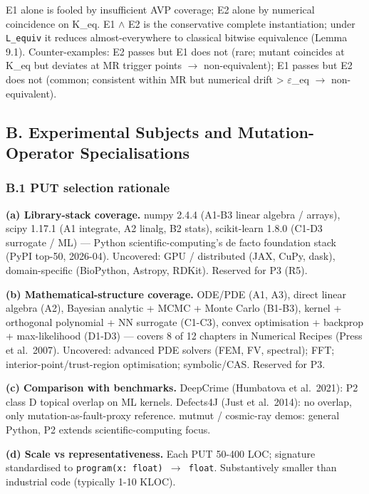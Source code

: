 \documentclass[review,12pt,authoryear]{elsarticle}
\begin{document}
E1 alone is fooled by insufficient AVP coverage; E2 alone by numerical
coincidence on K\_eq. E1 $\wedge$ E2 is the conservative complete
instantiation; under \texttt{L\_equiv} it reduces almost-everywhere to
classical bitwise equivalence (Lemma 9.1). Counter-examples: E2 passes
but E1 does not (rare; mutant coincides at K\_eq but deviates at MR
trigger points $\to$ non-equivalent); E1 passes but E2 does not (common;
consistent within MR but numerical drift \textgreater{} $\varepsilon$\_eq $\to$
non-equivalent).


\subsection{B. Experimental Subjects and Mutation-Operator Specialisations}\label{b.-experimental-subjects-and-mutation-operator-specialisations}

\subsubsection{B.1 PUT selection rationale}\label{b.1-put-selection-rationale-detailed-coverage-argument}

\textbf{(a) Library-stack coverage.} numpy 2.4.4 (A1-B3 linear algebra /
arrays), scipy 1.17.1 (A1 integrate, A2 linalg, B2 stats), scikit-learn
1.8.0 (C1-D3 surrogate / ML) --- Python scientific-computing's de facto
foundation stack (PyPI top-50, 2026-04). Uncovered: GPU / distributed
(JAX, CuPy, dask), domain-specific (BioPython, Astropy, RDKit). Reserved
for P3 (R5).

\textbf{(b) Mathematical-structure coverage.} ODE/PDE (A1, A3), direct
linear algebra (A2), Bayesian analytic + MCMC + Monte Carlo (B1-B3),
kernel + orthogonal polynomial + NN surrogate (C1-C3), convex
optimisation + backprop + max-likelihood (D1-D3) --- covers 8 of 12
chapters in Numerical Recipes (Press et al.~2007). Uncovered: advanced
PDE solvers (FEM, FV, spectral); FFT; interior-point/trust-region
optimisation; symbolic/CAS. Reserved for P3.

\textbf{(c) Comparison with benchmarks.} DeepCrime (Humbatova et
al.~2021): P2 class D topical overlap on ML kernels. Defects4J (Just et
al.~2014): no overlap, only mutation-as-fault-proxy reference. mutmut /
cosmic-ray demos: general Python, P2 extends scientific-computing focus.

\textbf{(d) Scale vs representativeness.} Each PUT 50-400 LOC; signature
standardised to \texttt{program(x:\ float)\ $\to$\ float}. Substantively
smaller than industrial code (typically 1-10 KLOC).
\end{document}
